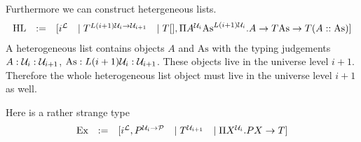 Furthermore we can construct hetergeneous lists.
$$
\begin{array}{lllll}
    \text{HL} &:=&
    [
        i^{\cal L}
        &\mid
        T^{L(i+1){\cal U}_i \to {\cal U}_{i+1}}
        &\mid
        T[],
        \Pi A^{{\cal U}_i} \text{As}^{L(i+1){\cal U}_i}.
            A \to T\text{As} \to T(A :: \text{As})
    ]
\end{array}
$$
A heterogeneous list contains objects $A$ and $\text{As}$ with the typing
judgements $A : {\cal U}_i : {\cal U}_{i+1}$, $\text{As}: L(i+1){\cal U}_i : {\cal U}_{i+1}$.
These objects live in the universe level $i+1$. Therefore the whole
heterogeneous list object must live in the universe level $i+1$ as well.


Here is a rather strange type
$$
\begin{array}{lllll}
    \text{Ex}
    &:=&
    [
        i^{\cal L},
        P^{{\cal U}_i \to {\cal P}}
        &\mid
        T^{{\cal U}_{i+1}}
        &\mid
        \Pi X^{{\cal U}_i}. P X \to T
    ]
\end{array}
$$
